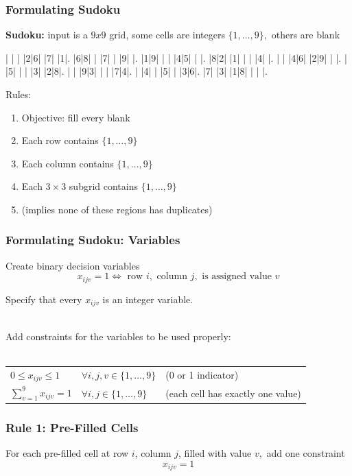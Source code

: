 \documentclass{beamer}
\newcommand{\stanza}{ \\~\ }
\begin{document}
\begin{frame} \frametitle{Formulating Sudoku}
  \textbf{Sudoku:} input is a $9 x 9$ grid, some cells are integers $\{1, \ldots, 9\},$ others are blank

  \begin{sudoku}
    | | | |2|6| |7| |1|.
    |6|8| | |7| | |9| |.
    |1|9| | | |4|5| | |.
    |8|2| |1| | | |4| |.
    | | |4|6| |2|9| | |.
    | |5| | | |3| |2|8|.
    | | |9|3| | | |7|4|.
    | |4| | |5| | |3|6|.
    |7| |3| |1|8| | | |.
  \end{sudoku}
  
  Rules:
  \begin{enumerate}
  \item Objective: fill every blank
  \item Each row contains $\{1, \ldots, 9\}$
  \item Each column contains $\{1, \ldots, 9\}$
  \item Each $3 \times 3$ subgrid contains $\{1, \ldots, 9\}$
  \item (implies none of these regions has duplicates)
  \end{enumerate}
  
  \end{frame}

\begin{frame} \frametitle{Formulating Sudoku: Variables}
  Create binary decision variables
  \[ x_{ijv} = 1 \Leftrightarrow
  \text{ row } i,
  \text{ column } j,
  \text{ is assigned value } v \]

  Specify that every $x_{ijv}$ is an integer variable.
  \stanza

  Add constraints for the variables to be used properly:
  \stanza
  
  \begin{tabular}{lll}
    $0 \leq x_{ijv} \leq 1$ & $\forall i, j, v \in \{1, \ldots, 9\}$ & (0 or 1 indicator) \\
    $\sum_{v=1}^9 x_{ijv} = 1$ & $\forall i, j \in \{1, \ldots, 9\}$ & (each cell has exactly one value)
  \end{tabular}
  
\end{frame}

\begin{frame} \frametitle{Rule 1: Pre-Filled Cells}

  For each pre-filled cell at row $i$, column $j$, filled with value $v,$ add one constraint
  \[ x_{ijv} =1 \]

\end{frame}
\end{document}
